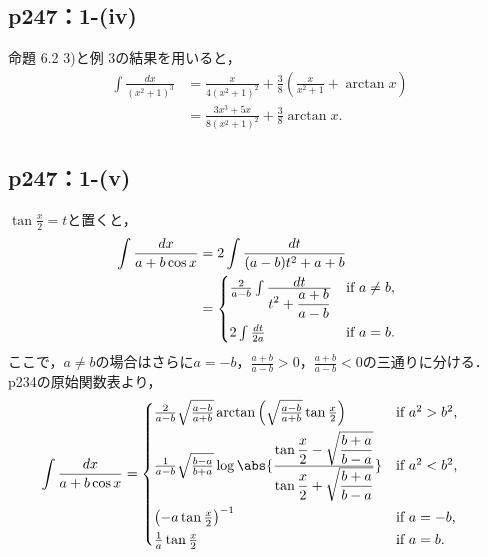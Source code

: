 \documentclass[a4paper,10pt,fleqn]{ltjsarticle}
\begin{document}
\subsection*{p247：1-(iv)}

\begin{leftbar}
    命題 6.2 3)と例 3の結果を用いると，
    \begin{align*}
        \int \frac{dx}{(x^2 + 1)^3}
         & = \frac{x}{4(x^2 + 1)^2} + \frac{3}{8}(\frac{x}{x^2 + 1} + \arctan x) \\
         & = \frac{3x^3 + 5x}{8(x^2+1)^2} + \frac{3}{8} \arctan x.
    \end{align*}
\end{leftbar}

\subsection*{p247：1-(v)}


\begin{tleftbar}
    $\tan \frac{x}{2} = t$と置くと，
    \begin{align*}
        \int \frac{dx}{a+b \cos x}
         & = 2 \int \frac{dt}{(a-b)t^2 + a+b} \\
         & =
        \begin{cases*}
            \frac{2}{a-b} \int \frac{\displaystyle dt}{\displaystyle t^2 + \frac{a+b}{a-b}}
                                 & if $a \neq b$, \\
            2 \int \frac{dt}{2a} & if $a = b$.
        \end{cases*}
    \end{align*}
    ここで，$a \neq b$の場合はさらに$a = -b$，$\frac{a+b}{a-b} > 0$，$\frac{a+b}{a-b} < 0$の三通りに分ける．p234の原始関数表より，
    \begin{align*}
        \int \frac{dx}{a+b \cos x}
         & =
        \begin{cases*}
            \frac{2}{a-b} \sqrt{\frac{a-b}{a+b}}
            \arctan \left({\sqrt{\frac{a-b}{a+b}} \tan \frac{x}{2}}\right) & if $a^2 > b^2$, \\
            \frac{1}{a-b} \sqrt{\frac{b-a}{b+a}}
            \log \abs{\frac{\displaystyle\tan \frac{x}{2}
                    - \sqrt{\frac{b+a}{b-a}}}{\displaystyle\tan \frac{x}{2} + \sqrt{\frac{b+a}{b-a}}}}
                                                                           & if $a^2 < b^2$, \\
            \left(-a \tan \frac{x}{2}\right)^{-1}                          & if $a = -b$,    \\
            \frac{1}{a} \tan {\frac{x}{2}}                                 & if $a = b$.
        \end{cases*}
    \end{align*}
\end{tleftbar}
\end{document}
